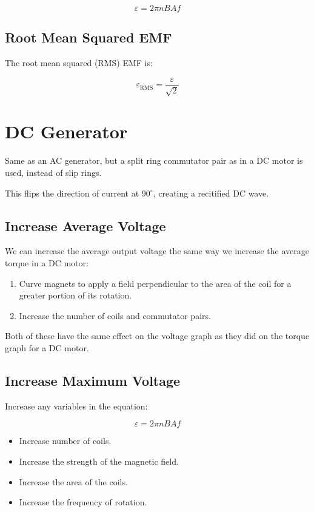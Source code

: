 \documentclass[a4paper,11pt]{article}
\begin{document}
$$
\varepsilon = 2\pi n BA f
$$


\subsection{Root Mean Squared EMF}

The root mean squared (RMS) EMF is:

$$
\varepsilon_{\mbox{RMS}} = \frac{\varepsilon}{\sqrt{2}}
$$




\section{DC Generator}

Same as an AC generator, but a split ring commutator pair as in a DC motor is
used, instead of slip rings.

This flips the direction of current at $90^\circ$, creating a recitified DC
wave.


\subsection{Increase Average Voltage}

We can increase the average output voltage the same way we increase the average
torque in a DC motor:

\begin{enumerate}
\item Curve magnets to apply a field perpendicular to the area of the coil for
	a greater portion of its rotation.
\item Increase the number of coils and commutator pairs.
\end{enumerate}

Both of these have the same effect on the voltage graph as they did on the
torque graph for a DC motor.


\subsection{Increase Maximum Voltage}

Increase any variables in the equation:

$$
\varepsilon = 2\pi n BA f
$$

\begin{itemize}
\item Increase number of coils.
\item Increase the strength of the magnetic field.
\item Increase the area of the coils.
\item Increase the frequency of rotation.
\end{itemize}
\end{document}

